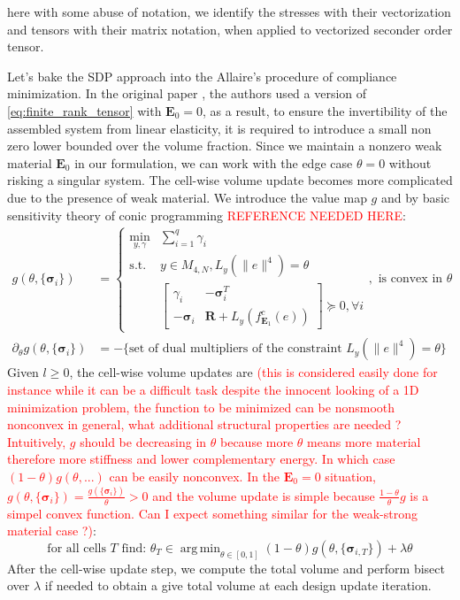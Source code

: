 \documentclass[preprint,3p]{elsarticle}
\newcommand{\tenss}[1]{\bm{\mathbf{#1}}}            %
\newcommand{\tensf}[1]{\bm{\mathbf{#1}}}            %
\newcommand{\stress}{\tenss{\sigma}}                %
\DeclareMathOperator*{\argmin}{arg\,min}
\begin{document}
here with some abuse of notation, we identify the stresses with their vectorization and tensors with their matrix notation, when applied to vectorized seconder order tensor.

Let's bake the SDP approach into the Allaire's procedure of compliance minimization. In the original paper \citep{allaire1997shape}, the authors used a version of \eqref{eq:finite_rank_tensor} with $\tensf{E}_0=0$, as a result, to ensure the invertibility of the assembled system from linear elasticity, it is required to introduce a small non zero lower bounded over the volume fraction. Since we maintain a nonzero weak material $\tensf{E}_0$ in our formulation, we can work with the edge case $\theta=0$ without risking a singular system. The cell-wise volume update becomes more complicated due to the presence of weak material. We introduce the value map $g$ and by basic sensitivity theory of conic programming \textcolor{red}{REFERENCE NEEDED HERE}: \begin{subequations}
    \begin{align}
        g(\theta,\{\stress_i\})&=\begin{cases}
            \min_{y,\gamma}&\sum_{i=1}^{q}\gamma_i\\
            \text{s.t.}& y\in M_{4,N},L_y(\lVert e\rVert^4)=\theta\\
            & \begin{bmatrix}\gamma_i&-\stress_i^T\\-\stress_i& \tensf{R}+L_y(f_{\tensf{E}_1}^c(e))\end{bmatrix}\succeq 0,\forall i
        \end{cases},\text{ is convex in $\theta$}\\
        \partial_\theta g(\theta,\{\stress_i\})&=-\{\text{set of dual multipliers of the constraint $L_y(\lVert e\rVert^4)=\theta$}\}
    \end{align}
\end{subequations}
Given $l\geq 0$, the cell-wise volume updates are \textcolor{red}{(this is considered easily done for instance while it can be a difficult task despite the innocent looking of a 1D minimization problem, the function to be minimized can be nonsmooth nonconvex in general, what additional structural properties are needed ? Intuitively, $g$ should be decreasing in $\theta$ because more $\theta$ means more material therefore more stiffness and lower complementary energy. In which case $(1-\theta)g(\theta,...)$ can be easily nonconvex. In the $\tensf{E}_0=0$ situation, $g(\theta,\{\stress_{i}\})=\frac{g(\{\stress_i\})}{\theta}>0$ and the volume update is simple because $\frac{1-\theta}{\theta}g$ is a simpel convex function. Can I expect something similar for the weak-strong material case ?)}:
%
\begin{equation}
    \text{for all cells $T$ find: } \theta_T\in \argmin_{\theta\in[0,1]} (1-\theta)g(\theta,\{\stress_{i,T}\})+\lambda \theta
\end{equation}
After the cell-wise update step, we compute the total volume and perform bisect over $\lambda$ if needed to obtain a give total volume at each design update iteration.
\fi



\end{document}
